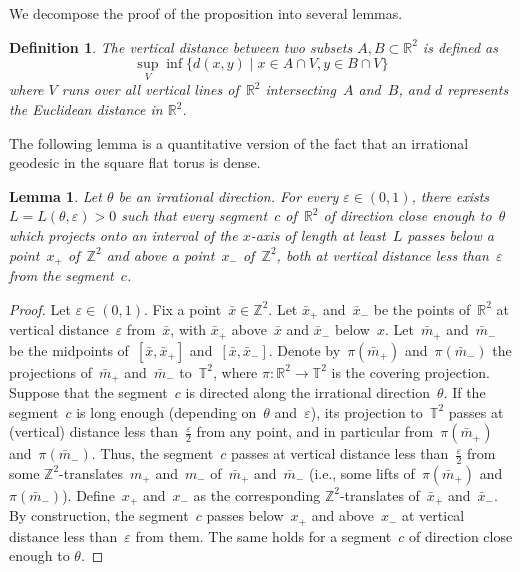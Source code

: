 \documentclass[10pt,a4paper]{amsart}
\newcommand{\ie}{i.e.\ }
\numberwithin{equation}{section}
\newcommand{\Z}{\mathbb{Z}}
\newcommand{\R}{\mathbb{R}}
\newcommand{\T}{\mathbb{T}}
\renewcommand{\ie}{i.e.}
\newtheorem{defi}[theo]{Definition}
\newtheorem{lemm}[theo]{Lemma}
\begin{document}
We decompose the proof of the proposition into several lemmas.

\begin{defi}
The \emph{vertical distance} between two subsets $A, B \subset \R^{2}$ is defined as
\[
\sup_{V} \inf\{d(x,y) \mid x\in A\cap V, y\in B\cap V\}
\]
where $V$ runs over all vertical lines of~$\R^2$ intersecting~$A$ and~$B$, and $d$ represents the Euclidean distance in $\R^{2}$.
\end{defi}

The following lemma is a quantitative version of the fact that an irrational geodesic in the square flat torus is dense.

\begin{lemm}\label{lem:dioph}
Let $\theta$ be an irrational direction. For every $\varepsilon \in (0,1)$, there exists $L=L(\theta,\varepsilon)>0$ such that every segment~$c$ of~$\R^2$ of direction close enough to~$\theta$ which projects onto an interval of the $x$-axis of length at least~$L$ passes below a point~$x_+$ of~$\Z^2$ and above a point~$x_-$ of~$\Z^2$, both at vertical distance less than~$\varepsilon$ from the segment~$c$.
\end{lemm}


\begin{proof}
Let $\varepsilon \in (0,1)$. Fix a point~$\bar{x} \in \Z^2$. Let $\bar{x}_+$ and~$\bar{x}_-$ be the points of~$\R^2$ at vertical distance~$\varepsilon$ from~$\bar{x}$, with $\bar{x}_+$ above~$\bar{x}$ and $\bar{x}_-$ below~$x$. Let~$\bar{m}_+$ and~$\bar{m}_-$ be the midpoints of~$[\bar{x},\bar{x}_+]$ and~$[\bar{x},\bar{x}_-]$. Denote by~$\pi(\bar{m}_+)$ and~$\pi(\bar{m}_-)$ the projections of~$\bar{m}_+$ and~$\bar{m}_-$ to~$\T^2$, where $\pi:\R^2 \to \T^2$ is the covering projection. Suppose that the segment~$c$ is directed along the irrational direction~$\theta$. If the segment~$c$ is long enough (depending on~$\theta$ and~$\varepsilon$), its projection to~$\T^2$ passes at (vertical) distance less than~$\frac{\varepsilon}{2}$ from any point, and in particular from~$\pi(\bar{m}_+)$ and~$\pi(\bar{m}_-)$. Thus, the segment~$c$ passes at vertical distance less than~$\frac{\varepsilon}{2}$ from some $\Z^2$-translates~$m_+$ and~$m_-$ of~$\bar{m}_+$ and~$\bar{m}_-$ (\ie, some lifts of~$\pi(\bar{m}_+)$ and~$\pi(\bar{m}_-)$). Define~$x_+$ and~$x_-$ as the corresponding $\Z^2$-translates of~$\bar{x}_+$ and~$\bar{x}_-$. By construction, the segment~$c$ passes below~$x_+$ and above~$x_-$ at vertical distance less than~$\varepsilon$ from them. The same holds for a segment~$c$ of direction close enough to $\theta$.
\end{proof}
\end{document}
